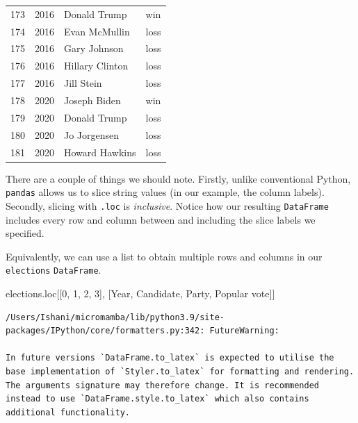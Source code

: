 \documentclass[
  letterpaper,
  DIV=11,
  numbers=noendperiod]{scrreprt}
\newenvironment{Shaded}{\begin{snugshade}}{\end{snugshade}}
\newcommand{\DecValTok}[1]{\textcolor[rgb]{0.68,0.00,0.00}{#1}}
\newcommand{\NormalTok}[1]{\textcolor[rgb]{0.00,0.23,0.31}{#1}}
\newcommand{\StringTok}[1]{\textcolor[rgb]{0.13,0.47,0.30}{#1}}
\begin{document}
\begin{tabular}{lrll}
173 &  2016 &            Donald Trump &    win \\
174 &  2016 &           Evan McMullin &   loss \\
175 &  2016 &            Gary Johnson &   loss \\
176 &  2016 &         Hillary Clinton &   loss \\
177 &  2016 &              Jill Stein &   loss \\
178 &  2020 &            Joseph Biden &    win \\
179 &  2020 &            Donald Trump &   loss \\
180 &  2020 &            Jo Jorgensen &   loss \\
181 &  2020 &          Howard Hawkins &   loss \\
\bottomrule
\end{tabular}

There are a couple of things we should note. Firstly, unlike
conventional Python, \texttt{pandas} allows us to slice string values
(in our example, the column labels). Secondly, slicing with
\texttt{.loc} is \emph{inclusive}. Notice how our resulting
\texttt{DataFrame} includes every row and column between and including
the slice labels we specified.

Equivalently, we can use a list to obtain multiple rows and columns in
our \texttt{elections} \texttt{DataFrame}.

\begin{Shaded}
\begin{Highlighting}[]
\NormalTok{elections.loc[[}\DecValTok{0}\NormalTok{, }\DecValTok{1}\NormalTok{, }\DecValTok{2}\NormalTok{, }\DecValTok{3}\NormalTok{], [}\StringTok{\textquotesingle{}Year\textquotesingle{}}\NormalTok{, }\StringTok{\textquotesingle{}Candidate\textquotesingle{}}\NormalTok{, }\StringTok{\textquotesingle{}Party\textquotesingle{}}\NormalTok{, }\StringTok{\textquotesingle{}Popular vote\textquotesingle{}}\NormalTok{]]}
\end{Highlighting}
\end{Shaded}

\begin{verbatim}
/Users/Ishani/micromamba/lib/python3.9/site-packages/IPython/core/formatters.py:342: FutureWarning:

In future versions `DataFrame.to_latex` is expected to utilise the base implementation of `Styler.to_latex` for formatting and rendering. The arguments signature may therefore change. It is recommended instead to use `DataFrame.style.to_latex` which also contains additional functionality.
\end{verbatim}
\end{document}
